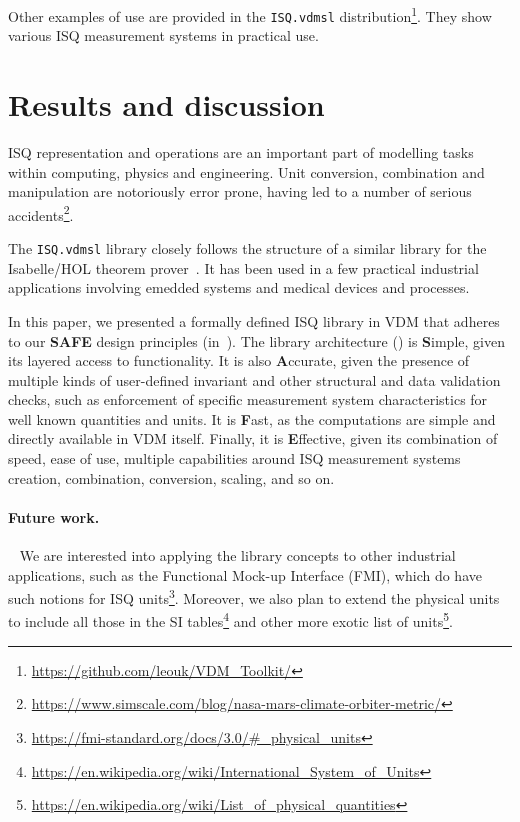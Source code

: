 \documentclass[runningheads,a4paper]{llncs}
\begin{document}
Other examples of use are provided in the \texttt{ISQ.vdmsl} distribution\footnote{\url{https://github.com/leouk/VDM_Toolkit/}}. They show various ISQ measurement systems in practical use.

\section{Results and discussion}\label{sec:Results}

ISQ representation and operations are an important part of modelling tasks within computing, physics and engineering. Unit conversion, combination and manipulation are notoriously error prone, having led to a number of serious accidents\footnote{\url{https://www.simscale.com/blog/nasa-mars-climate-orbiter-metric/}}.%

The \texttt{ISQ.vdmsl} library closely follows the structure of a similar library for the Isabelle/HOL theorem prover~\cite{Physical_Quantities-AFP}. It has been used in a few practical industrial applications involving emedded systems and medical devices and processes.  

In this paper, we presented a formally defined ISQ library in VDM that adheres to our \textbf{SAFE} design principles (in~). The library architecture () is \textbf{S}imple, given its layered access to functionality. It is also \textbf{A}ccurate, given the presence of multiple kinds of user-defined invariant and other structural and data validation checks, such as enforcement of specific measurement system characteristics for well known quantities and units. It is \textbf{F}ast, as the computations are simple and directly available in VDM itself. Finally, it is \textbf{E}ffective, given its combination of speed, ease of use, multiple capabilities around ISQ measurement systems creation, combination, conversion, scaling, and so on.   

\paragraph*{Future work.}~
%
We are interested into applying the library concepts to other industrial applications, such as the Functional Mock-up Interface (FMI), which do have such notions for ISQ units\footnote{\url{https://fmi-standard.org/docs/3.0/\#_physical_units}}. Moreover, we also plan to extend the physical units to include all those in the SI tables\footnote{\url{https://en.wikipedia.org/wiki/International_System_of_Units}} and other more exotic list of units\footnote{\url{https://en.wikipedia.org/wiki/List_of_physical_quantities}}. 
\end{document}
